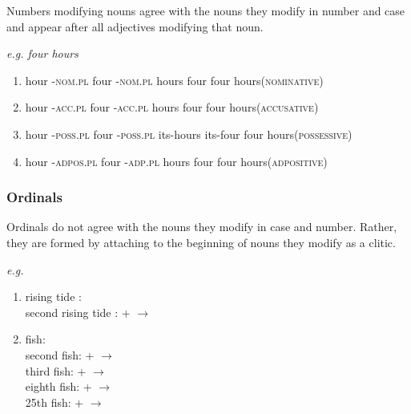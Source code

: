 \documentclass{article}
\newcommand{\h}{{$^h$}}
\newcommand{\R}{{\*r}}
\begin{document}
Numbers modifying nouns agree with the nouns they modify in number and case and appear after all adjectives modifying that noun.

\textit{e.g. four hours}
\begin{enumerate}
	\item
	{hour -\textsc{nom.pl} four -\textsc{nom.pl}}
	{hours {} four {} }
	{four hours(\textsc{nominative})}
	\item
		\trigloss[preamble={\textipa{xEn\R{} NeZ\R{}}  }]
	{\textipa{xEn} -\textipa{\R{}} \textipa{NeZ} -\textipa{\R{}} }
	{hour -\textsc{acc.pl} four -\textsc{acc.pl}}
	{hours {} four {}}
	{four hours(\textsc{accusative})}
	\item
	{hour -\textsc{poss.pl} four -\textsc{poss.pl}}
	{its-hours {} its-four {}}
	{four hours(\textsc{possessive})}
	\item 
	{hour -\textsc{adpos.pl} four -\textsc{adp.pl}}
	{hours {} four {} }
	{four hours(\textsc{adpositive})}
\end{enumerate}

\subsubsection{Ordinals}
Ordinals do not agree with the nouns they modify in case and number.  Rather, they are formed by attaching to the beginning of nouns they modify as a clitic.

\textit{e.g.} 
\begin{enumerate}
	\item
{rising tide :  \\
second rising tide : \textipa{ak\h} +  $\rightarrow$  }

\item
	{fish:  \\
second fish: \textipa{ak\h} +  $\rightarrow$  \\
third fish:  +  $\rightarrow$  \\
eighth fish:  +  $\rightarrow$  \\
25th fish:  +  $\rightarrow$    }
\end{enumerate}
\end{document}
